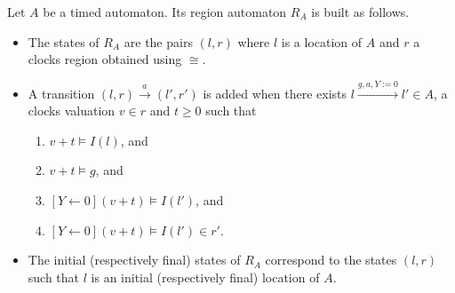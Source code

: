 \begin{definition} \cite{RADLD94,RA98}

Let $A$ be a timed automaton. Its region automaton $R_A$ is built as follows.
\begin{itemize}

  \item The states of $R_A$ are the pairs $(l, r)$ where $l$ is a location of $A$ and $r$ a clocks region obtained using $\cong$.

  \item A transition $(l, r) \xrightarrow{a} (l', r')$ is added when there exists $l \xrightarrow{g, a, Y := 0} l' \in A$, a clocks valuation $v \in r$ and $t \geq 0$ such that
  \begin{enumerate}

    \item $v + t \models I(l)$, and

    \item $v + t \models g$, and

    \item $[Y \leftarrow 0](v + t) \models I(l')$, and

    \item $[Y \leftarrow 0](v + t) \models I(l') \in r'$.

  \end{enumerate}

  \item The initial (respectively final) states of $R_A$ correspond to the states $(l, r)$ such that $l$ is an initial (respectively final) location of $A$.

\end{itemize}
\end{definition}

